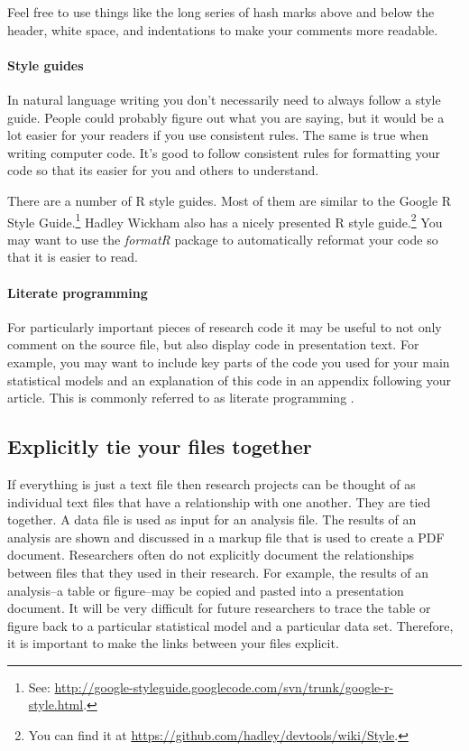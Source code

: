 \documentclass[krantz1]{krantz}
\begin{document}
\noindent Feel free to use things like the long series of hash marks above and below the header, white space, and indentations to make your comments more readable. 

\paragraph{Style guides}
In natural language writing you don't necessarily need to always follow a style guide. People could probably figure out what you are saying, but it would be a lot easier for your readers if you use consistent rules. The same is true when writing computer code. It's good to follow consistent rules for formatting your code so that its easier for you and others to understand.

There are a number of R style guides. Most of them are similar to the Google R Style Guide.\footnote{See: \url{http://google-styleguide.googlecode.com/svn/trunk/google-r-style.html}.} Hadley Wickham also has a nicely presented R style guide.\footnote{You can find it at \url{https://github.com/hadley/devtools/wiki/Style}.} You may want to use the {\emph{formatR}} \cite[]{R-formatR} package to automatically reformat your code so that it is easier to read.

\paragraph{Literate programming}

For particularly important pieces of research code it may be useful to not only comment on the source file, but also display code in presentation text. For example, you may want to include key parts of the code you used for your main statistical models and an explanation of this code in an appendix following your article. This is commonly referred to as literate programming  \cite[]{Knuth1992}. 

\subsection{Explicitly tie your files together}

If everything is just a text file then research projects can be thought of as individual text files that have a relationship with one another. They are tied together. A data file is used as input for an analysis file. The results of an analysis are shown and discussed in a markup file that is used to create a PDF document. Researchers often do not explicitly document the relationships between files that they used in their research. For example, the results of an analysis--a table or figure--may be copied and pasted into a presentation document. It will be very difficult for future researchers to trace the table or figure back to a particular statistical model and a particular data set. Therefore, it is important to make the links between your files explicit. 
\end{document}
